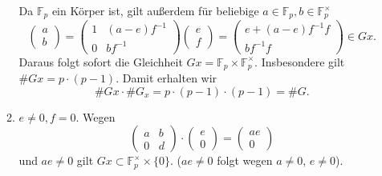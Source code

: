 \documentclass{article}
\begin{document}
\begin{enumerate}[(a)]
\begin{enumerate}[(1)]
                    Da $\mathbb{F}_p$ ein Körper ist, gilt außerdem für beliebige $a\in \mathbb{F}_p, b\in \mathbb{F}_p^\times$
                    \[
                        \begin{pmatrix}
                            a \\b
                        \end{pmatrix} = \begin{pmatrix}
                            1 & (a-e)f^{-1} \\
                            0 & bf^{-1}
                        \end{pmatrix} \begin{pmatrix}
                            e \\f
                        \end{pmatrix} = \begin{pmatrix}
                            e + (a-e)f^{-1}f \\
                            bf^{-1}f
                        \end{pmatrix} \in Gx.
                    \]
                    Daraus folgt sofort die Gleichheit $Gx = \mathbb{F}_p \times \mathbb{F}_p^\times$.
                    Insbesondere gilt $\# Gx = p \cdot (p-1)$. Damit erhalten wir
                    \[
                        \# Gx \cdot \# G_x = p\cdot (p-1) \cdot (p-1) = \# G.
                    \]
              \item $e\neq 0, f = 0$.
                    Wegen
                    \[
                        \begin{pmatrix}
                            a & b \\
                            0 & d
                        \end{pmatrix}  \cdot \begin{pmatrix}
                            e \\0
                        \end{pmatrix} = \begin{pmatrix}
                            ae \\0
                        \end{pmatrix}
                    \]
                    und $ae \neq 0$ gilt $Gx \subset \mathbb{F}_p^\times \times \{0\}$. ($ae\neq 0$ folgt wegen $a \neq 0$, $e\neq 0$).


\end{enumerate}
\end{enumerate}
\end{document}
